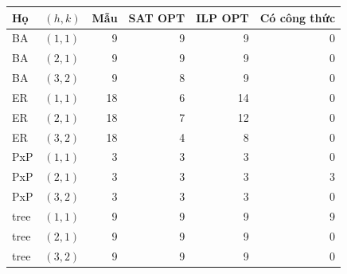 \begin{tabular}{llrrrr}
\toprule
Họ & $(h,k)$ & Mẫu & SAT OPT & ILP OPT & Có công thức\\
\midrule
BA & $(1,1)$ & 9 & 9 & 9 & 0\\
BA & $(2,1)$ & 9 & 9 & 9 & 0\\
BA & $(3,2)$ & 9 & 8 & 9 & 0\\
ER & $(1,1)$ & 18 & 6 & 14 & 0\\
ER & $(2,1)$ & 18 & 7 & 12 & 0\\
ER & $(3,2)$ & 18 & 4 & 8 & 0\\
PxP & $(1,1)$ & 3 & 3 & 3 & 0\\
PxP & $(2,1)$ & 3 & 3 & 3 & 3\\
PxP & $(3,2)$ & 3 & 3 & 3 & 0\\
tree & $(1,1)$ & 9 & 9 & 9 & 9\\
tree & $(2,1)$ & 9 & 9 & 9 & 0\\
tree & $(3,2)$ & 9 & 9 & 9 & 0\\
\bottomrule
\end{tabular}
